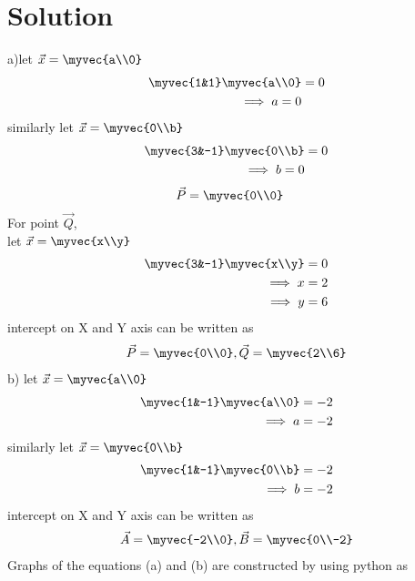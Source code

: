\documentclass[journal,12pt,twocolumn]{IEEEtran}
\begin{document}
\section{Solution}
a)let $\vec{x}=\myvec{a\\0}$
\begin{align}
\myvec{1&1}\myvec{a\\0}&=0\\
\implies a=0
\end{align}
similarly let $\vec{x}=\myvec{0\\b}$
\begin{align}
\myvec{3&-1}\myvec{0\\b}&=0\\
\implies b=0
\end{align}
\begin{align}
 \vec{P}&=\myvec{0\\0}
\end{align}
For point $\vec{Q}$,\\
let $\vec{x}=\myvec{x\\y}$   
\begin{align}
   \myvec{3&-1}\myvec{x\\y}=0 \\
   \implies x=2\\
   \implies y=6
\end{align}
intercept on X and Y axis can be written as
\begin{align}
    \vec{P}=\myvec{0\\0}, \vec{Q}=\myvec{2\\6}
\end{align}
b) let $\vec{x}=\myvec{a\\0}$
\begin{align}
    \myvec{1&-1}\myvec{a\\0}=-2\\
    \implies  a=-2
\end{align}
similarly let $\vec{x}=\myvec{0\\b}$
\begin{align}
\myvec{1&-1}\myvec{0\\b}=-2\\
\implies b=-2
\end{align}
intercept on X and Y axis can be written as
\begin{align}
   \vec{A}=\myvec{-2\\0},\vec{B}=\myvec{0\\-2} 
\end{align}
Graphs of the equations (a) and (b) are constructed by using python as
\end{document}
